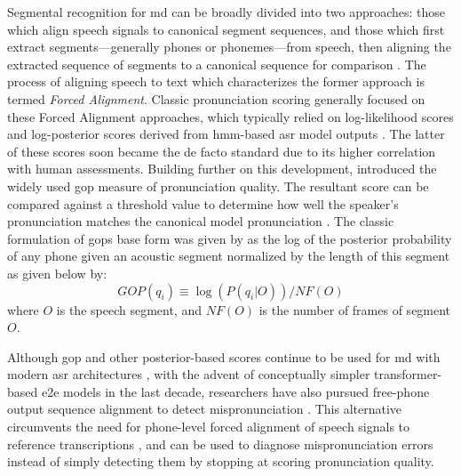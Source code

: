 \documentclass[thesis]{cluu}
\begin{document}
Segmental recognition for \gls{md} can be broadly divided into two approaches: those which align speech signals to canonical segment sequences, and those which first extract segments---generally phones or phonemes---from speech, then aligning the extracted sequence of segments to a canonical sequence for comparison \parencite{korzekwaComputerassistedPronunciationTraining2022}. The process of aligning speech to text which characterizes the former approach is termed \textit{Forced Alignment}. Classic pronunciation scoring generally focused on these Forced Alignment approaches, which typically relied on log-likelihood scores and log-posterior scores derived from \gls{hmm}-based \gls{asr} model outputs \parencite{wittAutomaticErrorDetection}. The latter of these scores soon became the de facto standard due to its higher correlation with human assessments. Building further on this development, \textcite{witt2000use} introduced the widely used \gls{gop} measure of pronunciation quality. The resultant score can be compared against a threshold value to determine how well the speaker's pronunciation matches the canonical model pronunciation \parencite{witt2014computer}. The classic formulation of \glspl{gop} base form was given by \textcite{witt2000use} as the log of the posterior probability of any phone given an acoustic segment normalized by the length of this segment as given below by:
\begin{equation}
  GOP(q_i)\equiv \log(P(q_i|O))/NF(O)
\end{equation}
where $O$ is the speech segment, and $NF(O)$ is the number of frames of segment $O$.

Although \gls{gop} and other posterior-based scores continue to be used for \gls{md} with modern \gls{asr} architectures \parencite[see][inter alia for examples]{parikhEvaluatingLogitBasedGOP2025,gongTransformerBasedMultiAspectMultiGranularity2022}, with the advent of conceptually simpler transformer-based \gls{e2e} models in the last decade, researchers have also pursued free-phone output sequence alignment to detect mispronunciation \parencite{wuTransformerBasedEndtoEnd2021}. This alternative circumvents the need for phone-level forced alignment of speech signals to reference transcriptions \parencite{loEffectiveEndtoEndModeling2020,leungCNNRNNCTCBasedEndtoend2019}, and can be used to diagnose mispronunciation errors instead of simply detecting them by stopping at scoring pronunciation quality.
\end{document}
